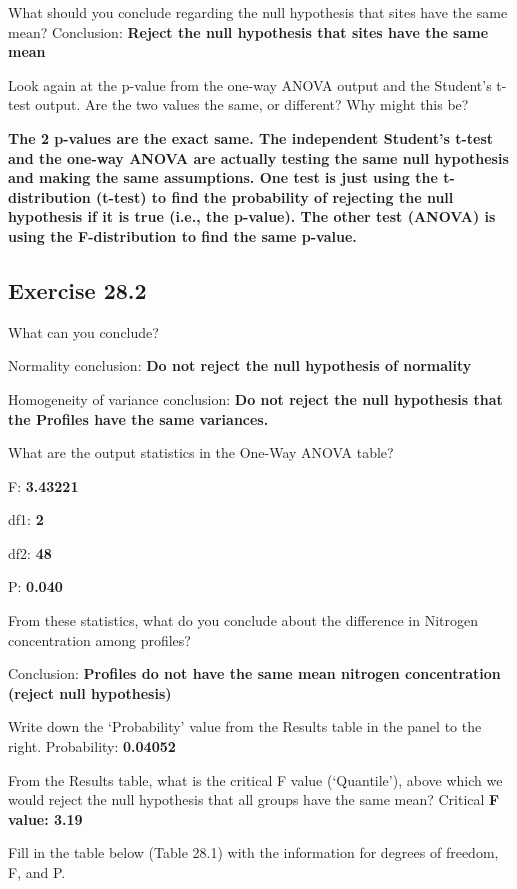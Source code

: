 \documentclass[
  openany]{krantz}
\begin{document}
What should you conclude regarding the null hypothesis that sites have the same mean?
Conclusion: \textbf{Reject the null hypothesis that sites have the same mean}

Look again at the p-value from the one-way ANOVA output and the Student's t-test output. Are the two values the same, or different? Why might this be?

\textbf{The 2 p-values are the exact same. The independent Student's t-test and the one-way ANOVA are actually testing the same null hypothesis and making the same assumptions. One test is just using the t-distribution (t-test) to find the probability of rejecting the null hypothesis if it is true (i.e., the p-value). The other test (ANOVA) is using the F-distribution to find the same p-value.}

\hypertarget{exercise-28.2}{%
\subsection{Exercise 28.2}\label{exercise-28.2}}

What can you conclude?

Normality conclusion: \textbf{Do not reject the null hypothesis of normality}

Homogeneity of variance conclusion: \textbf{Do not reject the null hypothesis that the Profiles have the same variances.}

What are the output statistics in the One-Way ANOVA table?

F: \textbf{3.43221}

df1: \textbf{2}

df2: \textbf{48}

P: \textbf{0.040}

From these statistics, what do you conclude about the difference in Nitrogen concentration among profiles?

Conclusion: \textbf{Profiles do not have the same mean nitrogen concentration (reject null hypothesis)}

Write down the `Probability' value from the Results table in the panel to the right.
Probability: \textbf{0.04052}

From the Results table, what is the critical F value (`Quantile'), above which we would reject the null hypothesis that all groups have the same mean? Critical \textbf{F value: 3.19}

Fill in the table below (Table 28.1) with the information for degrees of freedom, F, and P.
\end{document}
